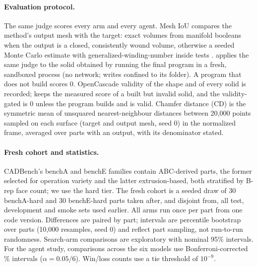 \paragraph{Evaluation protocol.}
The same judge scores every arm and every agent. Mesh IoU compares the method's output mesh with the target: exact volumes from manifold booleans \citep{manifold3d} when the output is a closed, consistently wound volume, otherwise a seeded Monte Carlo estimate with generalized-winding-number inside tests \citep{jacobson2013winding}. \iouc{} applies the same judge to the solid obtained by running the final program in a fresh, sandboxed process (no network; writes confined to its folder). A program that does not build scores 0. OpenCascade validity of the shape and of every solid is recorded; \iouc{} keeps the measured score of a built but invalid solid, and the validity-gated \ioug{} is 0 unless the program builds and is valid. Chamfer distance (CD) is the symmetric mean of unsquared nearest-neighbour distances between 20{,}000 points sampled on each surface (target and output mesh, seed 0) in the normalized frame, averaged over parts with an output, with its denominator stated.

\paragraph{Fresh cohort and statistics.}
CADBench's benchA and benchE families \citep{doris2026cadbench} contain ABC-derived parts, the former selected for operation variety and the latter extrusion-based, both stratified by B-rep face count; we use the hard tier. The fresh cohort is a seeded draw of 30 benchA-hard and 30 benchE-hard parts taken after, and disjoint from, all test, development and smoke sets used earlier. All arms run once per part from one code version. Differences are paired by part; intervals are percentile bootstrap over parts \citep{efron1993bootstrap} (10{,}000 resamples, seed 0) and reflect part sampling, not run-to-run randomness. Search-arm comparisons are exploratory with nominal 95\% intervals. For the agent study, comparisons across the six models use Bonferroni-corrected \bonfLevel\% intervals ($\alpha = 0.05/6$). Win/loss counts use a tie threshold of $10^{-9}$.
